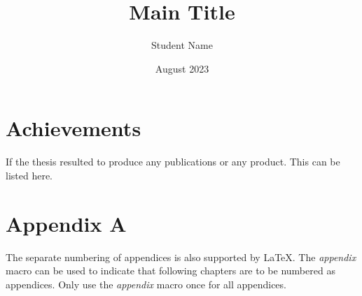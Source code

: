\documentclass[11pt,a4paper,oneside]{book} %
\title{Main Title}
\author{Student Name}
\date{August 2023}
\numberwithin{equation}{section}
\begin{document}
\maketitle









\tableofcontents
\listoftables
\listoffigures


\newpage



\resetpagenumbering









% 
% 
\printbibliography

\begin{appendix}
\chapter{Achievements}
If the thesis resulted to produce any publications or any product. This can be listed here.

\chapter{Appendix A}
The separate numbering of appendices is also supported by LaTeX. The \textit{appendix} macro can be used to indicate that following chapters are to be numbered as appendices. Only use the \textit{appendix} macro once for all appendices.



\end{appendix}
\end{document}
